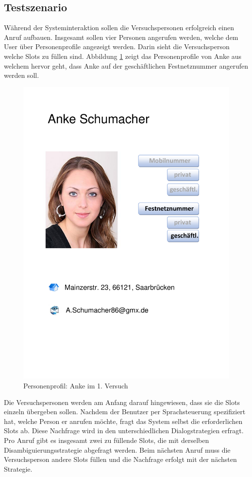 \documentclass[12pt,a4paper]{scrartcl}
\begin{document}
\subsection{Testszenario}
\label{testszenario1}
Während der Systeminteraktion sollen die Versuchspersonen erfolgreich einen Anruf aufbauen. Insgesamt sollen vier Personen angerufen werden, welche dem User über Personenprofile angezeigt werden.  Darin sieht die Versuchsperson welche Slots zu füllen sind. Abbildung \ref{anke} zeigt das Personenprofile von Anke aus welchem hervor geht, dass Anke auf der geschäftlichen Festnetznummer angerufen werden soll. 
\begin{figure}[htbp]
\begin{center}
\includegraphics[width=12cm]{Anke.pdf}
\caption{Personenprofil: Anke im 1. Versuch}
\label{anke}
\end{center}
\end{figure}
Die Versuchspersonen werden am Anfang darauf hingewiesen, dass sie die Slots einzeln übergeben sollen. Nachdem der Benutzer per Sprachsteuerung spezifiziert hat, welche Person er anrufen möchte, fragt das System selbst die erforderlichen Slots ab. Diese Nachfrage wird in den unterschiedlichen Dialogstrategien erfragt. Pro Anruf gibt es insgesamt zwei zu füllende Slots, die mit derselben Disambiguierungsstrategie abgefragt werden. Beim nächsten Anruf muss die Versuchsperson andere Slots füllen und die Nachfrage erfolgt mit der nächsten Strategie. 
\end{document}
